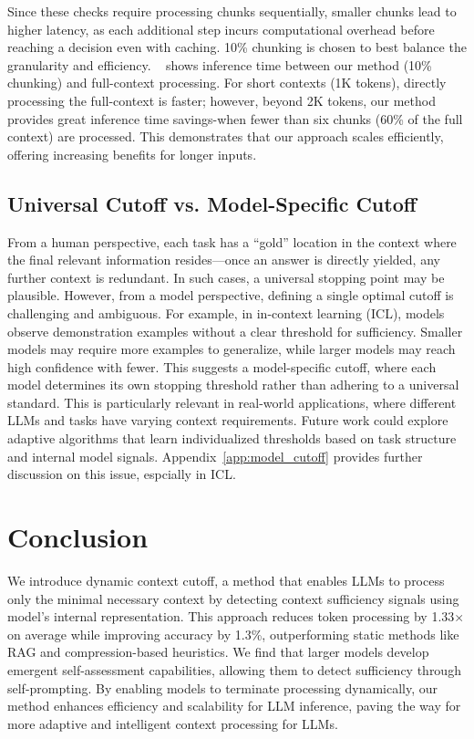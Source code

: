 Since these checks require processing chunks sequentially, smaller chunks lead to higher latency, as each additional step incurs computational overhead before reaching a decision even with caching. 10\% chunking is chosen to best balance the granularity and efficiency.
~ shows inference time between our method (10\% chunking) and full-context processing. For short contexts (1K tokens), directly processing the full-context is faster; however, beyond 2K tokens, our method provides great inference time savings-when fewer than six chunks (60\% of the full context) are processed. This demonstrates that our approach scales efficiently, offering increasing benefits for longer inputs.



\subsection{Universal Cutoff vs. Model-Specific Cutoff} \label{sec:future_work}
From a human perspective, each task has a ``gold'' location in the context where the final relevant information resides—once an answer is directly yielded, any further context is redundant. In such cases, a universal stopping point may be plausible. However, from a model perspective, defining a single optimal cutoff is challenging and ambiguous. For example, in in-context learning (ICL), models observe demonstration examples without a clear threshold for sufficiency. Smaller models may require more examples to generalize, while larger models may reach high confidence with fewer. This suggests a model-specific cutoff, where each model determines its own stopping threshold rather than adhering to a universal standard. This is particularly relevant in real-world applications, where different LLMs and tasks have varying context requirements. Future work could explore adaptive algorithms that learn individualized thresholds based on task structure and internal model signals. Appendix~\ref{app:model_cutoff} provides further discussion on this issue, espcially in ICL.



\section{Conclusion}
We introduce dynamic context cutoff, a method that enables LLMs to process only the minimal necessary context by detecting context sufficiency signals using model's internal representation. This approach reduces token processing by 1.33$\times$ on average while improving accuracy by 1.3\%, outperforming static methods like RAG and compression-based heuristics. We find that larger models develop emergent self-assessment capabilities, allowing them to detect sufficiency through self-prompting. By enabling models to terminate processing dynamically, our method enhances efficiency and scalability for LLM inference, paving the way for more adaptive and intelligent context processing for LLMs.


